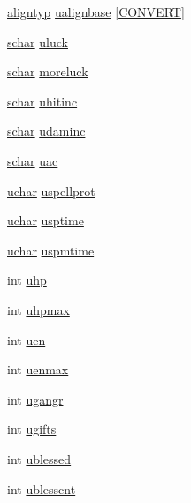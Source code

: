 \begin{DoxyCompactItemize}
\item 
\hyperlink{align_8h_a3e17b7a656899892e425fc89481aa2ab}{aligntyp} \hyperlink{structyou_a842b4c48c384af3e9a8156009f8a82ac}{ualignbase} \mbox{[}\hyperlink{you_8h_a1f7ee74ca1e8e147e9cd53302cfc443e}{C\+O\+N\+V\+E\+R\+T}\mbox{]}
\item 
\hyperlink{config_8h_a0fd9ce9d735064461bebfe6037026093}{schar} \hyperlink{structyou_a89d1a963eea3bc32c00233bc9332f24a}{uluck}
\item 
\hyperlink{config_8h_a0fd9ce9d735064461bebfe6037026093}{schar} \hyperlink{structyou_a31145ef2da40b2cf10a1a497688241a7}{moreluck}
\item 
\hyperlink{config_8h_a0fd9ce9d735064461bebfe6037026093}{schar} \hyperlink{structyou_a82f605992d46009b99965f3175ee4187}{uhitinc}
\item 
\hyperlink{config_8h_a0fd9ce9d735064461bebfe6037026093}{schar} \hyperlink{structyou_ae7c0602a1e4514ff0f22039746957799}{udaminc}
\item 
\hyperlink{config_8h_a0fd9ce9d735064461bebfe6037026093}{schar} \hyperlink{structyou_a4286c7d027f70b103209bb3406ea3d85}{uac}
\item 
\hyperlink{config_8h_a65f85814a8290f9797005d3b28e7e5fc}{uchar} \hyperlink{structyou_acc356d1f0009d4486e5cc977be49fd35}{uspellprot}
\item 
\hyperlink{config_8h_a65f85814a8290f9797005d3b28e7e5fc}{uchar} \hyperlink{structyou_a74dd5c0738d963691257cae4842927f0}{usptime}
\item 
\hyperlink{config_8h_a65f85814a8290f9797005d3b28e7e5fc}{uchar} \hyperlink{structyou_a7bc0458d075e246d875f8d3d59dcdf98}{uspmtime}
\item 
int \hyperlink{structyou_a94468a400f14da123d5160f8eefd7641}{uhp}
\item 
int \hyperlink{structyou_ade36670a142a7d38051c74740d02002b}{uhpmax}
\item 
int \hyperlink{structyou_a3c465c4017dafc312188046dde2fc080}{uen}
\item 
int \hyperlink{structyou_aed246159794c7c780aeea2aca5adabe8}{uenmax}
\item 
int \hyperlink{structyou_ace91478a77d9f0c0e8a8d44e33a0936a}{ugangr}
\item 
int \hyperlink{structyou_a36cd4ba10c14318080dfb1bc1cdcdcf7}{ugifts}
\item 
int \hyperlink{structyou_ac52be91176a57cbafbcf1703ef9623e2}{ublessed}
\item 
int \hyperlink{structyou_a073894acd6109cd0c989708fd7c4d8c9}{ublesscnt}
\item 

\end{DoxyCompactItemize}
